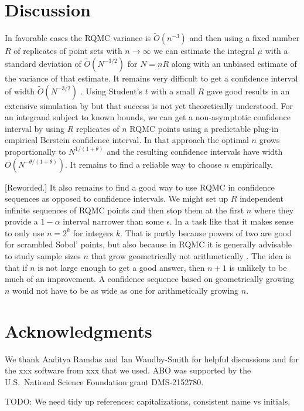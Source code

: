 \documentclass{article}
\newcommand{\art}[1]{\begingroup\color{blue}#1\endgroup}
\begin{document}
\section{Discussion}\label{sec:discussion}



In favorable cases
the RQMC variance is $\tilde O(n^{-3})$ and then
using a fixed number $R$ of replicates of
point sets with $n\to\infty$ we can estimate
the integral $\mu$ with a standard deviation 
of $\tilde O(N^{-3/2})$ for $N=nR$ along with
an unbiased estimate of the variance of that estimate.
It remains very difficult to get a confidence 
interval of width $\tilde O(N^{-3/2})$ \cite{err4qmc}.
Using Student's $t$ with a small $R$ gave good
results in an extensive simulation by \cite{LEcEtal24a}
but that success is not yet theoretically understood.
For an integrand subject to known bounds, we can get
a non-asymptotic confidence interval by using $R$
replicates of $n$ RQMC points using a
predictable plug-in empirical Berstein confidence
interval.  In that approach the optimal $n$
grows proportionally to $N^{1/(1+\theta)}$ and
the resulting confidence intervals have width
$O(N^{-\theta/(1+\theta)})$.
It remains to find a reliable way to choose $n$
empirically. 

\art{[Reworded.] It also remains to find a good way to
use RQMC in confidence sequences as opposed
to confidence intervals.   We might
set up $R$ independent infinite sequences of RQMC
points and then stop them at the first $n$
where they provide a $1-\alpha$ interval
narrower than some $\epsilon$.  In a task
like that it makes sense to only use
$n=2^k$ for integers $k$. 
That is partly because powers of two are good
for scrambled Sobol' points, but also because
in RQMC it is generally advisable to study
sample sizes $n$ that grow geometrically
not arithmetically \cite{sobo:1998}.  The
idea is that if $n$ is not large enough to get
a good answer, then $n+1$ is unlikely to be
much of an improvement.
A confidence sequence based on geometrically
growing $n$ would not have to be as wide as one for arithmetically
growing $n$.}


\section*{Acknowledgments}

We thank Aaditya Ramdas and Ian Waudby-Smith for helpful
discussions and for the \art{xxx} software
from \art{xxx} that we used.
ABO was supported by the U.S.\ National Science Foundation
grant DMS-2152780.

\art{TODO: We need tidy up references: capitalizations,
consistent name vs initials.}



\end{document}
